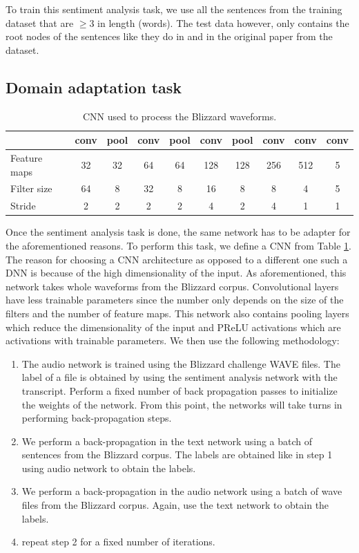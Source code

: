 To train this sentiment analysis task, we use all the sentences from the training dataset that are $\ge 3$ in length (words). The test data however, only contains the root nodes of the sentences like they do in \cite{DBLP:journals/corr/Kim14f} and in the original paper from the dataset.

\subsection*{Domain adaptation task}

\begin{table}[h]
    \centering
    \begin{tabular}{l|c|c|c|c|c|c|c|c|c}
                     & conv & pool & conv & pool & conv & pool & conv & conv & conv \\
        \hline
        Feature maps & 32    & 32   & 64   & 64   & 128  & 128  & 256 & 512  & 5 \\
        Filter size  & 64    & 8    & 32   & 8    & 16   & 8    & 8   & 4    & 5 \\
        Stride       & 2     & 2    & 2    & 2    & 4    & 2    & 4   & 1    & 1 \\
    \end{tabular}
    \caption{CNN used to process the Blizzard waveforms.}
    \label{tab:sent-cnn}
\end{table}

Once the sentiment analysis task is done, the same network has to be adapter for the aforementioned reasons. To perform this task, we define a CNN from Table \ref{tab:sent-cnn}. The reason for choosing a CNN architecture as opposed to a different one such a DNN is because of the high dimensionality of the input. As aforementioned, this network takes whole waveforms from the Blizzard corpus. Convolutional layers have less trainable parameters since the number only depends on the size of the filters and the number of feature maps. This network also contains pooling layers which reduce the dimensionality of the input \cite{scherer2010evaluation} and PReLU activations \cite{xu2015empirical} which are activations with trainable parameters. We then use the following methodology:

\begin{enumerate}
    \item The audio network is trained using the Blizzard challenge WAVE files. The label of a file is obtained by using the sentiment analysis network with the transcript. Perform a fixed number of back propagation passes to initialize the weights of the network. From this point, the networks will take turns in performing back-propagation steps.
    \item We perform a back-propagation in the text network using a batch of sentences from the Blizzard corpus. The labels are obtained like in step 1 using audio network to obtain the labels.
    \item We perform a back-propagation in the audio network using a batch of wave files from the Blizzard corpus. Again, use the text network to obtain the labels.
    \item repeat step 2 for  a fixed number of iterations.
\end{enumerate}

